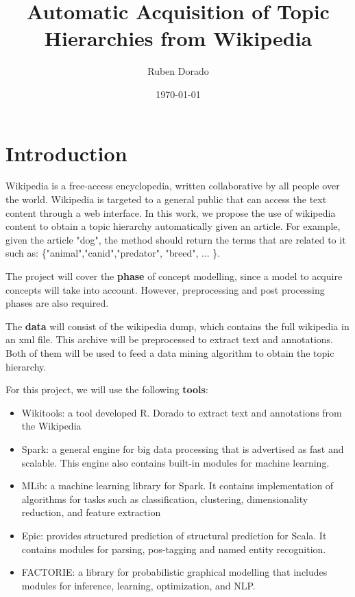 \documentclass[11pt]{article}
\title{\textbf{Automatic Acquisition of Topic Hierarchies from Wikipedia}}
\author{Ruben Dorado}
\date{\today}
\begin{document}
\maketitle


\section{Introduction}

Wikipedia is a free-access encyclopedia, written collaborative by all people over the world. Wikipedia is targeted to a general public that can access the text content through a web interface. In this work, we propose the use of wikipedia content to obtain a topic hierarchy automatically given an article. For example, given the article "dog", the method should return the terms that are related to it such as: \{"animal","canid","predator", "breed", ... \}.

The project will cover the {\bf phase} of concept modelling, since a model to acquire concepts will take into account. However, preprocessing and post processing phases are also required. 


The {\bf data} will consist of the wikipedia dump, which contains the full wikipedia in an xml file. This archive will be preprocessed to extract text and annotations. Both of them will be used to feed a data mining algorithm to obtain the topic hierarchy.

For this project, we will use the following {\bf tools}:

\begin{itemize}
 \item{Wikitools: a tool developed R. Dorado to extract text and annotations from the Wikipedia} 
 \item{Spark: a general engine for big data processing that is advertised as fast and scalable. This engine also contains built-in modules for machine learning.}
 \item{MLib: a machine learning library for Spark. It contains implementation of algorithms for tasks such as classification, clustering, dimensionality reduction, and feature extraction}
 \item{Epic: provides structured prediction of structural prediction for Scala. It contains modules for parsing, pos-tagging and named entity recognition.}
 \item{FACTORIE: a library for probabilistic graphical modelling that includes modules for inference, learning, optimization, and NLP.}
\end{itemize}




\end{document}
